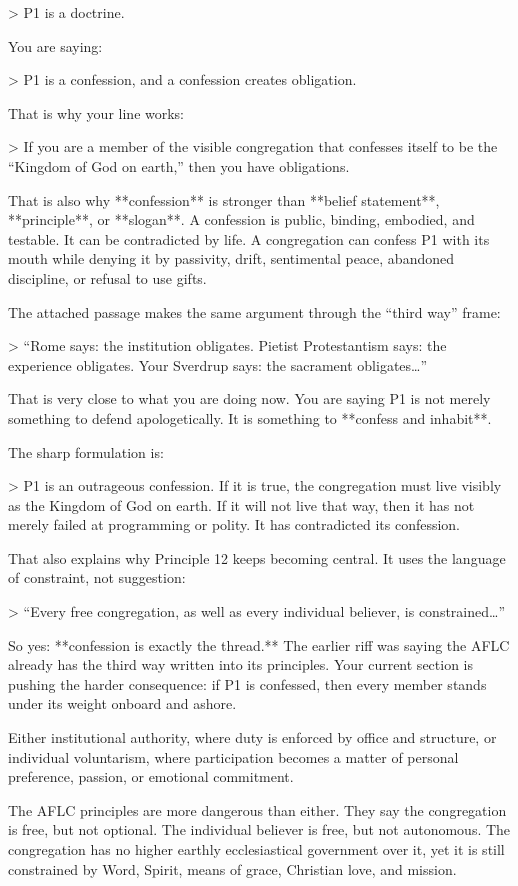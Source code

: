 > P1 is a doctrine.

You are saying:

> P1 is a confession, and a confession creates obligation.

That is why your line works:

> If you are a member of the visible congregation that confesses itself to be the “Kingdom of God on earth,” then you have obligations.

That is also why **confession** is stronger than **belief statement**, **principle**, or **slogan**. A confession is public, binding, embodied, and testable. It can be contradicted by life. A congregation can confess P1 with its mouth while denying it by passivity, drift, sentimental peace, abandoned discipline, or refusal to use gifts.

The attached passage makes the same argument through the “third way” frame:

> “Rome says: the institution obligates. Pietist Protestantism says: the experience obligates. Your Sverdrup says: the sacrament obligates…” 

That is very close to what you are doing now. You are saying P1 is not merely something to defend apologetically. It is something to **confess and inhabit**.

The sharp formulation is:

> P1 is an outrageous confession. If it is true, the congregation must live visibly as the Kingdom of God on earth. If it will not live that way, then it has not merely failed at programming or polity. It has contradicted its confession.

That also explains why Principle 12 keeps becoming central. It uses the language of constraint, not suggestion:

> “Every free congregation, as well as every individual believer, is constrained…” 

So yes: **confession is exactly the thread.** The earlier riff was saying the AFLC already has the third way written into its principles. Your current section is pushing the harder consequence: if P1 is confessed, then every member stands under its weight onboard and ashore.



Either institutional authority, where duty is enforced by office and structure, or individual voluntarism, where participation becomes a matter of personal preference, passion, or emotional commitment.

The AFLC principles are more dangerous than either. They say the congregation is free, but not optional. The individual believer is free, but not autonomous. The congregation has no higher earthly ecclesiastical government over it, yet it is still constrained by Word, Spirit, means of grace, Christian love, and mission.





